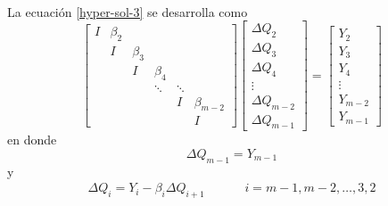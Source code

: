 \documentclass[letterpaper, openright, 12pt]{book}
\begin{document}
    \paragraph*{}
        La ecuación \ref{hyper-sol-3} se desarrolla como
        \begin{equation}
            \begin{bmatrix}
                I & \beta_2\\
                & I & \beta_3\\
                & & I & \beta_4\\
                & & & \ddots & \ddots\\
                & & & & I & \beta_{m-2}\\
                & & & & & I
            \end{bmatrix}
            \begin{bmatrix}
                \Delta Q_2\\
                \Delta Q_3\\
                \Delta Q_4\\
                \vdots\\
                \Delta Q_{m-2}\\
                \Delta Q_{m-1}
            \end{bmatrix}
            =
            \begin{bmatrix}
                Y_2\\
                Y_3\\
                Y_4\\
                \vdots\\
                Y_{m-2}\\
                Y_{m-1}
            \end{bmatrix}
        \end{equation}
        en donde
        \begin{equation}
            \Delta Q_{m-1} = Y_{m-1}
        \end{equation}
        y
        \begin{align}
            \Delta Q_i = Y_i - \beta_i \Delta Q_{i+1} &&&& i = m-1, m-2, \dots, 3, 2
        \end{align}\\
%
%
%
%
%


%
%
%
%
%
%
%
%
\cleardoublepage
{} %


\end{document}
